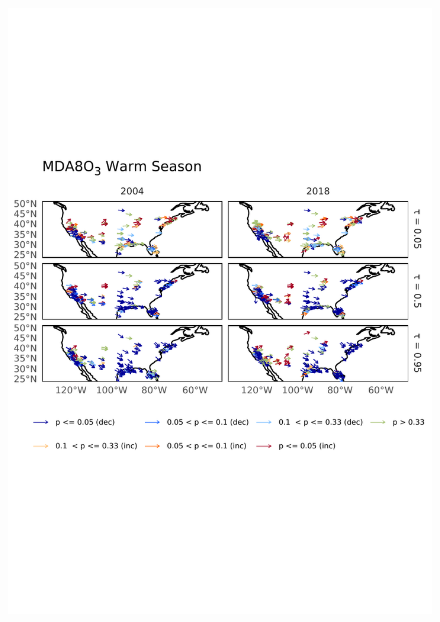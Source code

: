 \documentclass[journal abbreviation, manuscript]{copernicus}
\begin{document}
\begin{figure}[h!]
\centering
\includegraphics[height=\textheight]{figures/paper_figures/o3_map/o3_map_piecewise_stats_freeTau_mda8_anom_warm_us_o3.pdf}
\caption{}
\label{fig:o3_map_us_mda8_warm}
\end{figure}
\end{document}
